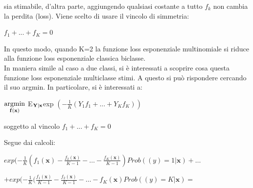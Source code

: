 sia stimabile, d'altra parte, 
aggiungendo qualsiasi costante a tutto \begin{math}f_k\end{math} non cambia la perdita (loss). Viene scelto di usare il 
vincolo di simmetria:
\begin{center}
 \begin{math} f_1 + ... + f_K = 0
\end{math}
\end{center}
In questo modo, quando K=2 la funzione loss esponenziale multinomiale si riduce alla funzione loss esponenziale 
classica biclasse.\\
\newline
In maniera simile al caso a due classi, si \`e interessati a scoprire cosa questa funzione loss esponenziale 
multiclasse stimi. A questo si pu\`o rispondere cercando il suo argmin. 
In particolare, si \`e interessati a:
\begin{center}
 \begin{math} \underset{\begin{bf}f(x)\end{bf}}{\operatorname{argmin}}\end{math} 
E\begin{math}_{\begin{bf}Y|x\end{bf}} \end{math}exp
\begin{math}(-\frac{1}{K}(Y_1f_1 + ... + Y_Kf_K))
\end{math}
\end{center}
\begin{center}
 soggetto al vincolo \begin{math}f_1 + ... + f_K = 0
\end{math}
\end{center}
Segue dai calcoli:
\begin{center}
\begin{math}
exp (-\frac{1}{K}( f_1(\textbf{x}) - \frac{f_2(\textbf{x})}{K-1} - \dots - \frac{f_K(\textbf{x})}{K-1}) Prob ((y)=1|\textbf{x}) + 
\dots  
\end{math}
\end{center}

\begin{center}
 \begin{math}
  + exp (-\frac{1}{K}( \frac{f_1(\textbf{x})}{K-1} - \frac{f_2(\textbf{x})}{K-1} - \dots - f_K(\textbf{x}) 
Prob ((y)=K|\textbf{x}) =
 \end{math}
\end{center}

